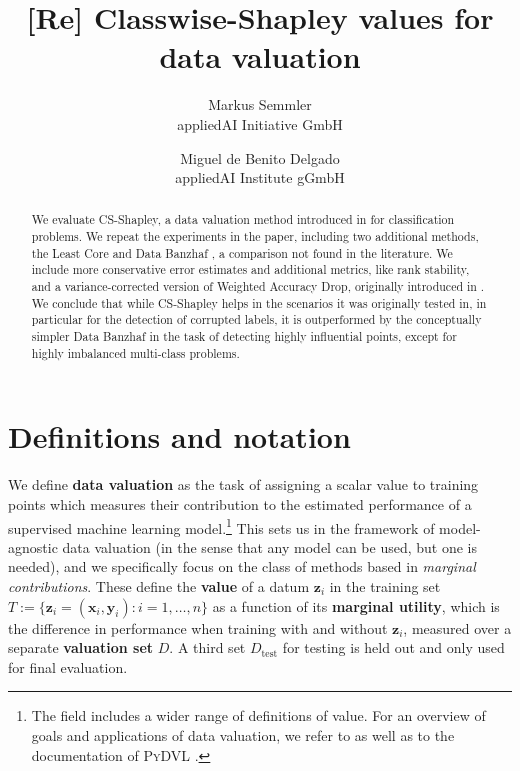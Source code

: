 \documentclass[10pt]{article}
\newcommand{\assign}{:=}
\newcommand{\tmaffiliation}[1]{\\ #1}
\newcommand{\tmdfn}[1]{\textbf{#1}}
\newcommand{\tmem}[1]{{\em #1\/}}
\newcommand{\tmmathbf}[1]{\ensuremath{\boldsymbol{#1}}}
\newcommand{\tmname}[1]{\textsc{#1}}
\newcommand{\tmop}[1]{\ensuremath{\operatorname{#1}}}
\begin{document}
\title{[Re] Classwise-Shapley values for data valuation}

\author{
  Markus Semmler
  \tmaffiliation{appliedAI Initiative GmbH}
  \and
  Miguel de Benito Delgado
  \tmaffiliation{appliedAI Institute gGmbH}
}

\maketitle

\begin{abstract}
  We evaluate CS-Shapley, a data valuation method introduced in
  {\cite{schoch_csshapley_2022}} for classification problems. We repeat the
  experiments in the paper, including two additional methods, the Least Core
  {\citep{yan_if_2021}} and Data Banzhaf {\citep{wang_data_2022}}, a
  comparison not found in the literature. We include more conservative error
  estimates and additional metrics, like rank stability, and a
  variance-corrected version of Weighted Accuracy Drop, originally introduced
  in {\cite{schoch_csshapley_2022}}. We conclude that while CS-Shapley helps
  in the scenarios it was originally tested in, in particular for the
  detection of corrupted labels, it is outperformed by the conceptually
  simpler Data Banzhaf in the task of detecting highly influential points,
  except for highly imbalanced multi-class problems.
\end{abstract}

\section{Definitions and notation}

We define {\tmdfn{data valuation}} as the task of assigning a scalar value to
training points which measures their contribution to the estimated performance
of a supervised machine learning model.\footnote{The field includes a wider
range of definitions of value. For an overview of goals and applications of
data valuation, we refer to {\cite{sim_data_2022}} as well as to the
documentation of {\tmname{PyDVL}} {\citep{transferlab_pydvl_2022}}.} This
sets us in the framework of model-agnostic data valuation (in the sense that
any model can be used, but one is needed), and we specifically focus on the
class of methods based in {\tmem{marginal contributions}}. These define the
{\tmdfn{value}} of a datum $\tmmathbf{z}_i$ in the training set $T \assign
\{\tmmathbf{z}_i = (\tmmathbf{x}_i, \tmmathbf{y}_i) : i = 1, \ldots, n\}$ as a
function of its {\tmdfn{marginal utility}}, which is the difference in
performance when training with and without $\tmmathbf{z}_i$, measured over a
separate {\tmdfn{valuation set}} $D$. A third set $D_{\tmop{test}}$ for
testing is held out and only used for final evaluation.
\end{document}
